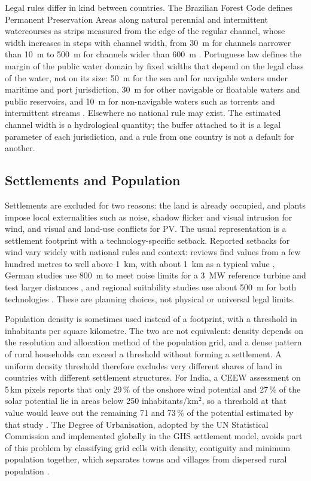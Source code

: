 Legal rules differ in kind between countries. The Brazilian Forest Code
defines Permanent Preservation Areas along natural perennial and
intermittent watercourses as strips measured from the edge of the
regular channel, whose width increases in steps with channel width, from
30~m for channels narrower than 10~m to 500~m for channels wider than
600~m \cite{brasil2012forestcode}. Portuguese law defines the margin of
the public water domain by fixed widths that depend on the legal class of
the water, not on its size: 50~m for the sea and for navigable waters
under maritime and port jurisdiction, 30~m for other navigable or
floatable waters and public reservoirs, and 10~m for non-navigable waters
such as torrents and intermittent streams \cite{portugal2005lei54}. Elsewhere no
national rule may exist. The estimated channel width is a hydrological
quantity; the buffer attached to it is a legal parameter of each
jurisdiction, and a rule from one country is not a default for another.

\subsection{Settlements and Population}
\label{subsec:settlement_review}

Settlements are excluded for two reasons: the land is already occupied,
and plants impose local externalities such as noise, shadow flicker and
visual intrusion for wind, and visual and land-use conflicts for PV. The
usual representation is a settlement footprint with a technology-specific
setback. Reported setbacks for wind vary widely with national rules and
context: reviews find values from a few hundred metres to well above
1~km, with about 1~km as a typical value \cite{rediske2021}, German
studies use 800~m to meet noise limits for a 3~MW reference turbine and
test larger distances \cite{drechsler2017,lehmann2021,lehmann2023}, and
regional suitability studies use about 500~m for both technologies
\cite{watson2015,uyan2013}. These are planning choices, not physical or
universal legal limits.

Population density is sometimes used instead of a footprint, with a
threshold in inhabitants per square kilometre. The two are not
equivalent: density depends on the resolution and allocation method of
the population grid, and a dense pattern of rural households can exceed
a threshold without forming a settlement. A uniform density threshold
therefore excludes very different shares of land in countries with
different settlement structures. For India, a CEEW assessment on 5\,km pixels reports
that only 29\,\% of the onshore wind potential and 27\,\% of the solar
potential lie in areas below 250 inhabitants/km$^2$, so a threshold at
that value would leave out the remaining 71 and 73\,\% of the potential
estimated by that study \cite{mallya2024ceew}.
The Degree of Urbanisation, adopted by
the UN Statistical Commission and implemented globally in the GHS
settlement model, avoids part of this problem by classifying grid cells
with density, contiguity and minimum population together, which
separates towns and villages from dispersed rural population
\cite{schiavina2023smod}.

